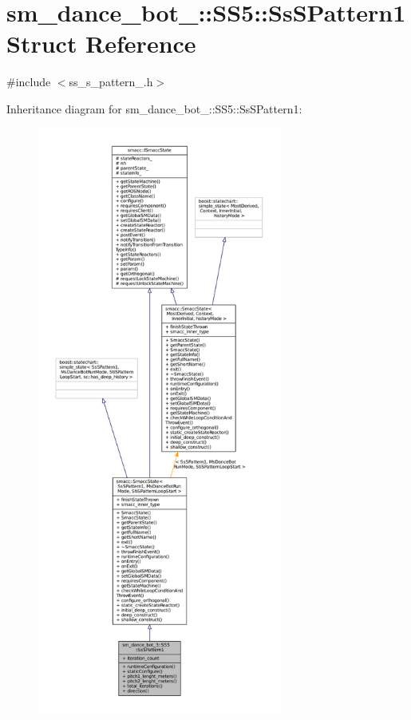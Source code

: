 \hypertarget{structsm__dance__bot__3_1_1SS5_1_1SsSPattern1}{}\section{sm\+\_\+dance\+\_\+bot\+\_\+:\+:S\+S5\+:\+:Ss\+S\+Pattern1 Struct Reference}
\label{structsm__dance__bot__3_1_1SS5_1_1SsSPattern1}


{\ttfamily \#include $<$ss\+\_\+s\+\_\+pattern\+\_.\+h$>$}



Inheritance diagram for sm\+\_\+dance\+\_\+bot\+\_\+:\+:S\+S5\+:\+:Ss\+S\+Pattern1\+:
\nopagebreak
\begin{figure}[H]
\begin{center}
\leavevmode
\includegraphics[height=550pt]{structsm__dance__bot__3_1_1SS5_1_1SsSPattern1__inherit__graph}
\end{center}
\end{figure}



